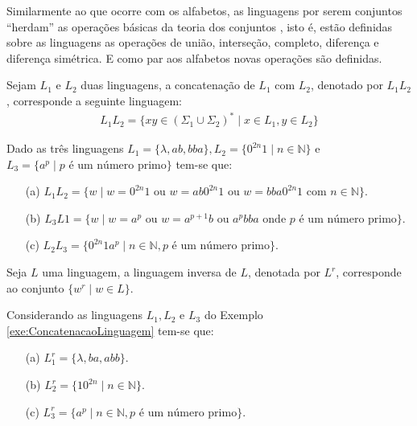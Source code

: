 Similarmente ao que ocorre com os alfabetos, as linguagens por serem conjuntos ``herdam'' as operações básicas da teoria dos conjuntos \cite{lipschutz1978-TC, lipschutz2013-MD, abe1991-TC}, isto é, estão definidas sobre as linguagens as operações de união, interseção, completo, diferença e diferença simétrica. E como par aos alfabetos novas operações são definidas.

\begin{definition}\label{def:ConcatenacaoLinguagem}
	Sejam $L_1$ e $L_2$ duas linguagens, a concatenação de $L_1$ com $L_2$, denotado por $L_1L_2$, corresponde a seguinte linguagem:
	\begin{eqnarray}
		L_1L_2 = \{xy \in (\Sigma_1 \cup \Sigma_2)^* \mid x \in L_1, y \in L_2\}
	\end{eqnarray}
\end{definition}

\begin{exem}\label{exe:ConcatenacaoLinguagem}
	Dado as três linguagens $L_1 = \{\lambda, ab, bba\}, L_2 =\{0^{2n}1 \mid n \in \mathbb{N}\}$ e $L_3 = \{a^p \mid p \text{ é um número primo}\}$ tem-se que:
	\begin{itemize}
		\item[(a)] $L_1L_2 = \{w \mid w = 0^{2n}1 \text{ ou } w = ab0^{2n}1 \text{ ou } w = bba0^{2n}1 \text{ com } n \in \mathbb{N}\}$.
		\item[(b)] $L_3L1 = \{w \mid w = a^p \text{ ou } w = a^{p+1}b \text{ ou } a^pbba \text{ onde } p \text{ é um número primo}\}$.
		\item[(c)] $L_2L_3 = \{0^{2n}1a^p \mid n \in \mathbb{N}, p \text{ é um número primo}\}$.
	\end{itemize}
\end{exem}

\begin{definition}\label{def:LinguagemReversa}
	Seja $L$ uma linguagem, a linguagem inversa de $L$, denotada por $L^r$, corresponde ao conjunto $\{w^r \mid w \in L\}$.
\end{definition}

\begin{exem}
	Considerando as linguagens $L_1, L_2$ e $L_3$ do Exemplo \ref{exe:ConcatenacaoLinguagem} tem-se que:
	\begin{itemize}
		\item[(a)] $L_1^r = \{\lambda, ba, abb\}$.
		\item[(b)] $L_2^r = \{10^{2n} \mid n \in \mathbb{N}\}$.
		\item[(c)] $L_3^r = \{a^p \mid n \in \mathbb{N}, p \text{ é um número primo}\}$.
	\end{itemize}
\end{exem}


